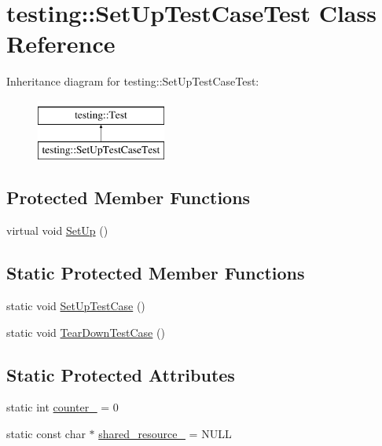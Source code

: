 \hypertarget{classtesting_1_1SetUpTestCaseTest}{}\section{testing\+::Set\+Up\+Test\+Case\+Test Class Reference}
\label{classtesting_1_1SetUpTestCaseTest}
Inheritance diagram for testing\+::Set\+Up\+Test\+Case\+Test\+:\begin{figure}[H]
\begin{center}
\leavevmode
\includegraphics[height=2.000000cm]{classtesting_1_1SetUpTestCaseTest}
\end{center}
\end{figure}
\subsection*{Protected Member Functions}
\begin{DoxyCompactItemize}
\item 
virtual void \mbox{\hyperlink{classtesting_1_1SetUpTestCaseTest_a4b44551ccf73e66de7ec95b2ab3b2085}{Set\+Up}} ()
\end{DoxyCompactItemize}
\subsection*{Static Protected Member Functions}
\begin{DoxyCompactItemize}
\item 
static void \mbox{\hyperlink{classtesting_1_1SetUpTestCaseTest_a50732abc0bcb3725e6dfd6a2d487e944}{Set\+Up\+Test\+Case}} ()
\item 
static void \mbox{\hyperlink{classtesting_1_1SetUpTestCaseTest_abdc133cd161ff2fa317f489da9bdccf3}{Tear\+Down\+Test\+Case}} ()
\end{DoxyCompactItemize}
\subsection*{Static Protected Attributes}
\begin{DoxyCompactItemize}
\item 
static int \mbox{\hyperlink{classtesting_1_1SetUpTestCaseTest_a5b6e811128d35389be49f6569bf93817}{counter\+\_\+}} = 0
\item 
static const char $\ast$ \mbox{\hyperlink{classtesting_1_1SetUpTestCaseTest_a904e77fd9a628b6a9aca0280665fd040}{shared\+\_\+resource\+\_\+}} = N\+U\+LL
\end{DoxyCompactItemize}
